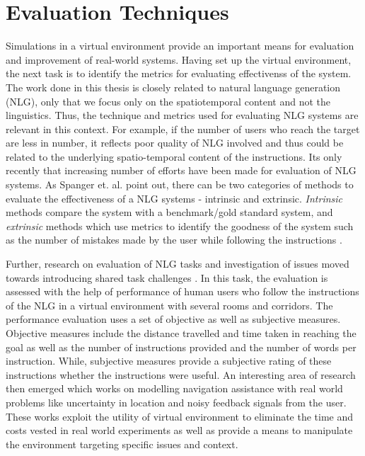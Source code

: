 \documentclass{iitkthesis}
\begin{document}
 \section{Evaluation Techniques}
Simulations in a virtual environment provide an important means for evaluation and improvement of real-world systems. Having set up the virtual environment, the next task is to identify the metrics for evaluating effectivenss of the system. The work done in this thesis is closely related to natural language generation (NLG), only that we focus only on the spatiotemporal content and not the linguistics. Thus, the technique and metrics used for evaluating NLG systems are relevant in this context. For example, if the number of users who reach the target are less in number, it reflects poor quality of NLG involved and thus could be related to the underlying spatio-temporal content of the instructions. Its only recently that increasing number of efforts have been made for evaluation of NLG systems. As Spanger et. al. \cite{spanger} point out, there can be two categories of methods to evaluate the effectiveness of a NLG systems - intrinsic and extrinsic. \textit{Intrinsic} methods compare the system with a benchmark/gold standard system, and \textit{extrinsic} methods which use metrics to identify the goodness of the system such as the number of mistakes made by the user while following the instructions \cite{young}. 


Further, research on evaluation of NLG tasks and investigation of issues moved towards introducing shared task challenges \cite{give}. In this task, the evaluation is assessed with the help of performance of human users who follow the instructions of the NLG in a virtual environment with several rooms and corridors. The performance evaluation uses a set of objective as well as subjective measures. Objective measures include the distance travelled and time taken in reaching the goal as well as the number of instructions provided and the number of words per instruction. While, subjective measures provide a subjective rating of these instructions whether the instructions were useful. An interesting area of research \cite{GRUVE} then emerged which works on modelling navigation assistance with real world problems like uncertainty in location and noisy feedback signals from the user. These works exploit the utility of virtual environment to eliminate the time and costs vested in real world experiments as well as provide a means to manipulate the environment targeting specific issues and context.
\end{document}
